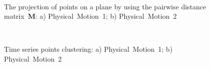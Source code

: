 \documentclass[12pt, twoside]{article}
\numberwithin{equation}{section}
\begin{document}
\begin{figure}[h!t]\center
{}
\\
\caption{The projection of points on a plane by using the pairwise distance matrix~$\textbf{M}$: a) Physical~Motion~1; b) Physical~Motion~2}
\label{fig_real_2D}
\end{figure}

\begin{figure}[h!t]\center
{}
\\
\caption{Time series points clustering: 
a) Physical~Motion~1; b) Physical~Motion~2}
\label{fig_real_claster}
\end{figure}
\end{document}
